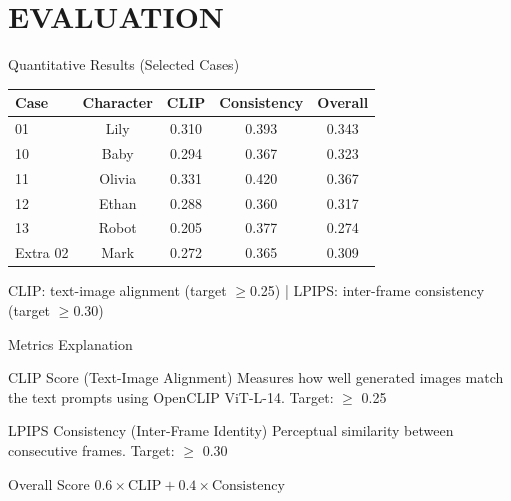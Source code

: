 \documentclass{beamer}
\begin{document}
\section{EVALUATION}
\begin{frame}{Quantitative Results (Selected Cases)}
    \footnotesize
    \begin{table}
        \begin{tabular}{|l|c|c|c|c|}
            \hline
            \textbf{Case} & \textbf{Character} & \textbf{CLIP} & \textbf{Consistency} & \textbf{Overall} \\
            \hline
            01 & Lily & 0.310 & 0.393 & 0.343 \\
            \hline
            10 & Baby & 0.294 & 0.367 & 0.323 \\
            \hline
            11 & Olivia & 0.331 & 0.420 & 0.367 \\
            \hline
            12 & Ethan & 0.288 & 0.360 & 0.317 \\
            \hline
            13 & Robot & 0.205 & 0.377 & 0.274 \\
            \hline
            Extra 02 & Mark & 0.272 & 0.365 & 0.309 \\
            \hline
        \end{tabular}
    \end{table}
    \vspace{0.5em}
    \tiny CLIP: text-image alignment (target $\geq$0.25) | LPIPS: inter-frame consistency (target $\geq$0.30)
\end{frame}

\begin{frame}{Metrics Explanation}
    \footnotesize
    \begin{block}{CLIP Score (Text-Image Alignment)}
        \footnotesize
        Measures how well generated images match the text prompts using OpenCLIP ViT-L-14. Target: $\geq$ 0.25
    \end{block}
    \begin{block}{LPIPS Consistency (Inter-Frame Identity)}
        \footnotesize
        Perceptual similarity between consecutive frames. Target: $\geq$ 0.30
    \end{block}
    \begin{block}{Overall Score}
        \footnotesize
        $0.6 \times \text{CLIP} + 0.4 \times \text{Consistency}$
    \end{block}
\end{frame}
\end{document}
